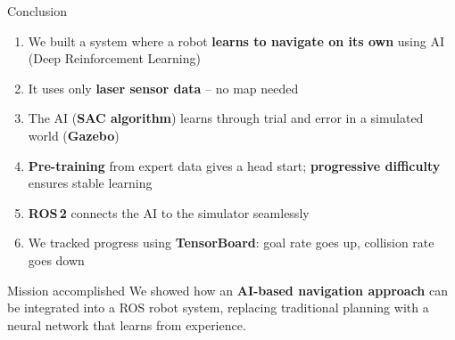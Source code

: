 \documentclass[aspectratio=169, 11pt]{beamer}
\begin{document}
\begin{frame}{Conclusion}
  \small
  \begin{enumerate}
    \setlength{\itemsep}{0.3em}
    \item We built a system where a robot \textbf{learns to navigate
          on its own} using AI (Deep Reinforcement Learning)
    \item It uses only \textbf{laser sensor data} -- no map needed
    \item The AI (\textbf{SAC algorithm}) learns through trial and error
          in a simulated world (\textbf{Gazebo})
    \item \textbf{Pre-training} from expert data gives a head start;
          \textbf{progressive difficulty} ensures stable learning
    \item \textbf{ROS\,2} connects the AI to the simulator seamlessly
    \item We tracked progress using \textbf{TensorBoard}: goal rate
          goes up, collision rate goes down
  \end{enumerate}

  \vspace{0.3em}

  \begin{exampleblock}{Mission accomplished}
    \small We showed how an \textbf{AI-based navigation approach} can be
    integrated into a ROS robot system, replacing traditional planning
    with a neural network that learns from experience.
  \end{exampleblock}
\end{frame}
\end{document}
